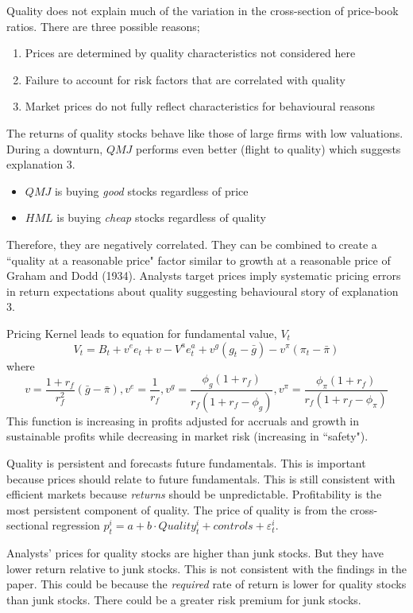 Quality does not explain much of the variation in the cross-section of price-book ratios. There are three possible reasons;
\begin{enumerate}
  \item Prices are determined by quality characteristics not considered here
  \item Failure to account for risk factors that are correlated with quality
  \item Market prices do not fully reflect characteristics for behavioural reasons
\end{enumerate}
The returns of quality stocks behave like those of large firms with low valuations. During
a downturn, $QMJ$ performs even better (flight to quality) which suggests explanation 3.
\begin{itemize}
  \item $QMJ$ is buying \emph{good} stocks regardless of price
  \item $HML$ is buying \emph{cheap} stocks regardless of quality
\end{itemize}
Therefore, they are negatively correlated. They can be combined to create a ``quality at a
reasonable price" factor similar to growth at a reasonable price of Graham and Dodd
(1934). Analysts target prices imply systematic pricing errors in return expectations
about quality suggesting behavioural story of explanation 3.

Pricing Kernel leads to equation for fundamental value, $V_t$
\[
V_t=B_t+v^ee_t+v-V^ae^a_t+v^g(g_t-\bar{g})-v^\pi(\pi_t-\bar{\pi})
\]
where
\[
v=\frac{1+r_f}{r^2_f}(\bar{g}-\bar{\pi}),
v^e=\frac{1}{r_f},
v^g=\frac{\phi_g(1+r_f)}{r_f(1+r_f-\phi_g)},
v^\pi=\frac{\phi_\pi(1+r_f)}{r_f(1+r_f-\phi_\pi)}
\]
This function is increasing in profits adjusted for accruals and growth in sustainable
profits while decreasing in market risk (increasing in ``safety").

Quality is persistent and forecasts future fundamentals. This is important because prices
should relate to future fundamentals. This is still consistent with efficient markets
because \emph{returns} should be unpredictable. Profitability is the most persistent component of quality. The price of quality is from the cross-sectional regression
$p^i_t=a+b\cdot Quality^i_t+controls+\varepsilon^i_t$.

Analysts' prices for quality stocks are higher than junk stocks. But they have lower
return relative to junk stocks. This is not consistent with the findings in the paper.
This could be because the \emph{required} rate of return is lower for quality stocks than
junk stocks. There could be a greater risk premium for junk stocks.

